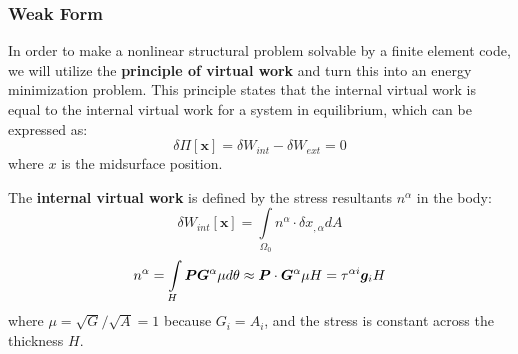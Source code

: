 \documentclass[]{spie}  %
\begin{document}
\subsubsection{Weak Form}
In order to make a nonlinear structural problem solvable by a finite element code, we will utilize the \textbf{principle of virtual work} and turn this into an energy minimization problem. This principle states that the internal virtual work is equal to the internal virtual work for a system in equilibrium, which can be expressed as:
\begin{equation}
\label{eq: principle of virtual work}
\delta\Pi[\bm{x}] = \delta W_{int} - \delta W_{ext} = 0
\end{equation}
where $x$ is the midsurface position.

The \textbf{internal virtual work} is defined by the stress resultants $n^\alpha$ in the body:
\begin{equation}
\label{eq: internal virtual work}
\delta W_{int}[\bm{x}] = \int\limits_{\Omega_0} n^\alpha \cdot \delta x_{,\alpha} dA
\end{equation}
\begin{equation}
\label{eq: stress resultant}
n^\alpha = \int\limits_{H} \bm{P} \bm{G}^\alpha \mu d\theta \approx \bm{P} \cdot \bm{G}^\alpha \mu H = \tau^{\alpha i} \bm{g}_i H \\
\end{equation}
where $\mu = \sqrt{G} / \sqrt{A} = 1$ because $G_i = A_i$, and the stress is constant across the thickness $H$. 
\end{document}
